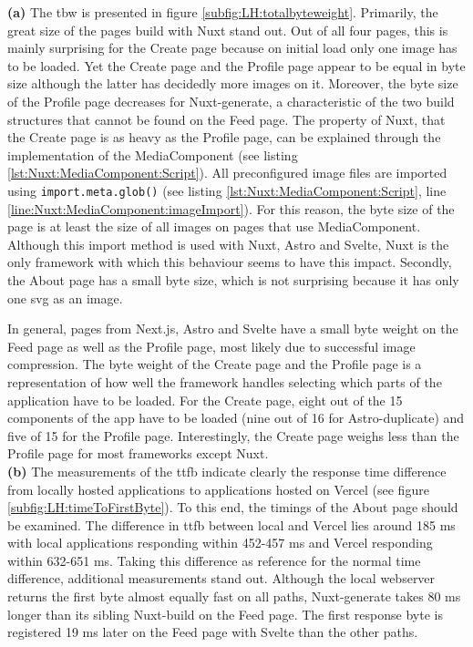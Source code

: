 \documentclass[a4paper, 12pt]{article}
\begin{document}
\textbf{(a)} The \acrlong{tbw} is presented in figure \ref{subfig:LH:totalbyteweight}.
Primarily, the great size of the pages build with Nuxt stand out.
Out of all four pages, this is mainly surprising for the Create page because on initial load only one image has to be loaded.
Yet the Create page and the Profile page appear to be equal in byte size although the latter has decidedly more images on it.
Moreover, the byte size of the Profile page decreases for Nuxt-generate, a characteristic of the two build structures that cannot be found on the Feed page.
The property of Nuxt, that the Create page is as heavy as the Profile page, can be explained through the implementation of the MediaComponent (see listing \ref{lst:Nuxt:MediaComponent:Script}).
All preconfigured image files are imported using \lstinline{import.meta.glob()} (see listing \ref{lst:Nuxt:MediaComponent:Script}, line \ref{line:Nuxt:MediaComponent:imageImport}).
For this reason, the byte size of the page is at least the size of all images on pages that use MediaComponent.
Although this import method is used with Nuxt, Astro and Svelte, Nuxt is the only framework with which this behaviour seems to have this impact.
Secondly, the About page has a small byte size, which is not surprising because it has only one \acrshort{svg} as an image.

In general, pages from Next.js, Astro and Svelte have a small byte weight on the Feed page as well as the Profile page, most likely due to successful image compression.
The byte weight of the Create page and the Profile page is a representation of how well the framework handles selecting which parts of the application have to be loaded.
For the Create page, eight out of the 15 components of the app have to be loaded (nine out of 16 for Astro-duplicate) and five of 15 for the Profile page.
Interestingly, the Create page weighs less than the Profile page for most frameworks except Nuxt.
\\

\textbf{(b)} The measurements of the \acrlong{ttfb} indicate clearly the response time difference from locally hosted applications to applications hosted on Vercel (see figure \ref{subfig:LH:timeToFirstByte}).
To this end, the timings of the About page should be examined.
The difference in \acrshort{ttfb} between local and Vercel lies around 185 ms with local applications responding within 452-457 ms and Vercel responding within 632-651 ms.
Taking this difference as reference for the normal time difference, additional measurements stand out.
Although the local webserver returns the first byte almost equally fast on all paths, Nuxt-generate takes 80 ms longer than its sibling Nuxt-build on the Feed page.
The first response byte is registered 19 ms later on the Feed page with Svelte than the other paths.
\end{document}
